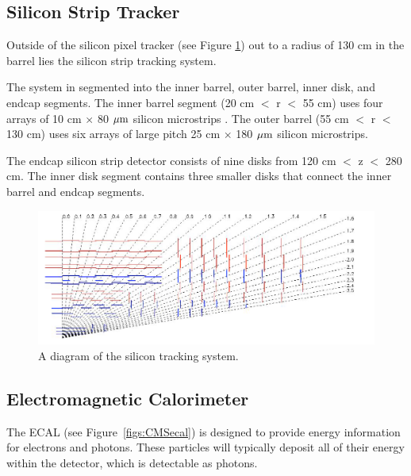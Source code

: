 \subsection{Silicon Strip Tracker}
Outside of the silicon pixel tracker (see Figure \ref{figs:CMStracker}) out to a radius of 130 cm in the barrel lies the silicon strip tracking system.  

The system in segmented into the inner barrel, outer barrel, inner disk, and endcap segments.  
The inner barrel segment (20 cm $<$ r $<$ 55 cm) uses four arrays of 10 cm $\times$ 80 $\mathrm{\mu m}$ silicon microstrips .  
The outer barrel (55 cm  $<$ r $<$ 130 cm) uses six arrays of large pitch 25 cm $\times$ 180 $\mathrm{\mu m}$ silicon microstrips.  

The endcap silicon strip detector consists of nine disks from 120 cm  $<$ z $<$ 280 cm.  
The inner disk segment contains three smaller disks that connect the inner barrel and endcap segments.  

\begin{figure}
\begin{center}
\includegraphics[width=1.0\linewidth]{figs/CMStracker.png}
\caption{A diagram of the silicon tracking system.}
\label{figs:CMStracker}
\end{center}
\end{figure}
  


\subsection{Electromagnetic Calorimeter}
The ECAL (see Figure~\ref{figs:CMSecal}) is designed to provide energy information for electrons and photons.  
These particles will typically deposit all of their energy within the detector, which is detectable as photons. 

